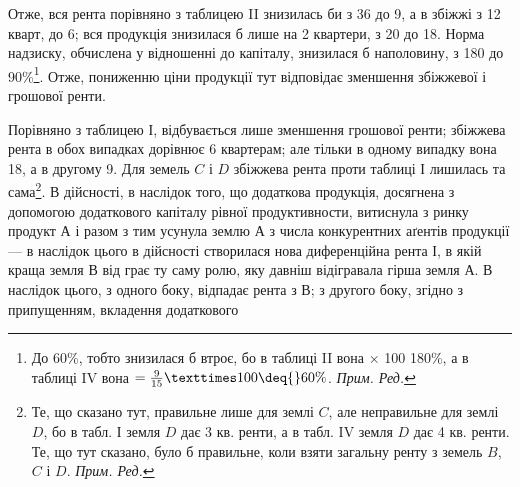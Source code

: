 Отже, вся рента порівняно з таблицею II знизилась би з 36
до 9, а в збіжжі з 12 кварт, до 6; вся продукція знизилася б лише на 2
квартери, з 20 до 18. Норма надзиску, обчислена у відношенні до капіталу,
знизилася б наполовину, з 180 до 90\%\footnote*{
До 60\%, тобто знизилася б втроє, бо в таблиці II вона \deq{}  × 100 \deq{} 180\%, а в таблиці
IV вона $= \frac{9}{15} × 100 \deq{} 60\%$. \emph{Прим. Ред.}
}. Отже, пониженню ціни продукції
тут відповідає зменшення збіжжевої і грошової ренти.

Порівняно з таблицею І, відбувається лише зменшення грошової ренти;
збіжжева рента в обох випадках дорівнює 6 квартерам; але тільки в одному
випадку вона \deq{} 18, а в другому \deq{} 9. Для земель $C$ і $D$
збіжжева рента проти таблиці І лишилась та сама\footnote*{
Те, що сказано тут, правильне лише для землі $C$, але неправильне для землі $D$, бо в табл. І земля
$D$ дає 3 кв. ренти, а в табл. IV земля $D$ дає 4 кв. ренти. Те, що тут сказано, було б правильне, коли
взяти загальну ренту з земель $B$, $C$ і $D$. \emph{Прим. Ред.}
}. В дійсності, в наслідок
того, що додаткова продукція, досягнена з допомогою додаткового капіталу рівної
продуктивности, витиснула з ринку продукт $А$ і разом з тим усунула землю $А$
з числа конкурентних аґентів продукції — в наслідок цього в дійсності створилася
нова диференційна рента І, в якій краща земля $В$ від грає ту саму ролю,
яку давніш відігравала гірша земля $А$. В наслідок цього, з одного боку, відпадає
рента з $В$; з другого боку, згідно з припущенням, вкладення додаткового
\parbreak{}  %
